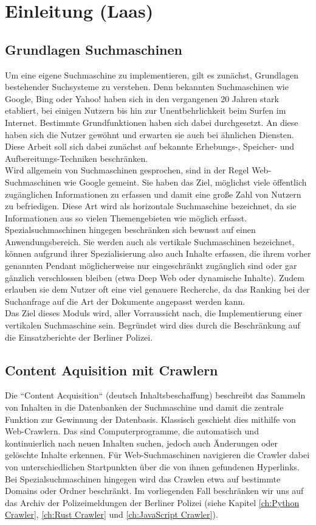 \chapter{Einleitung \small(Laas)}

\section{Grundlagen Suchmaschinen}
Um eine eigene Suchmaschine zu implementieren, gilt es zunächst, Grundlagen bestehender Suchsysteme zu verstehen. Denn bekannten Suchmaschinen wie Google, Bing oder Yahoo! haben sich in den vergangenen 20 Jahren stark etabliert, bei einigen Nutzern bis hin zur Unentbehrlichkeit beim Surfen im Internet. Bestimmte Grundfunktionen haben sich dabei durchgesetzt. An diese haben sich die Nutzer gewöhnt und erwarten sie auch bei ähnlichen Diensten. Diese Arbeit soll sich dabei zunächst auf bekannte Erhebungs-, Speicher- und Aufbereitungs-Techniken beschränken.\\
Wird allgemein von Suchmaschinen gesprochen, sind in der Regel Web-Suchmaschinen wie Google gemeint. Sie haben das Ziel, möglichst viele öffentlich zugänglichen Informationen zu erfassen und damit eine große Zahl von Nutzern zu befriedigen. Diese Art wird als horizontale Suchmaschine bezeichnet, da sie Informationen aus so vielen Themengebieten wie möglich erfasst.\\
Spezialsuchmaschinen hingegen beschränken sich bewusst auf einen Anwendungsbereich. Sie werden auch als vertikale Suchmaschinen bezeichnet, können aufgrund ihrer Spezialisierung also auch Inhalte erfassen, die ihrem vorher genannten Pendant möglicherweise nur eingeschränkt zugänglich sind oder gar gänzlich verschlossen bleiben (etwa Deep Web oder dynamische Inhalte). Zudem erlauben sie dem Nutzer oft eine viel genauere Recherche, da das Ranking bei der Suchanfrage auf die Art der Dokumente angepasst werden kann.\\
Das Ziel dieses Moduls wird, aller Vorraussicht nach, die Implementierung einer vertikalen Suchmaschine sein. Begründet wird dies durch die Beschränkung auf die Einsatzberichte der Berliner Polizei. \cite{suchmverst} \cite{boldsuche}

\section{Content Aquisition mit Crawlern}
Die ``Content Acquisition`` (deutsch Inhaltsbeschaffung) beschreibt das Sammeln von Inhalten in die Datenbanken der Suchmaschine und damit die zentrale Funktion zur Gewinnung der Datenbasis. Klassisch geschieht dies mithilfe von Web-Crawlern. Das sind Computerprogramme, die automatisch und kontinuierlich nach neuen Inhalten suchen, jedoch auch Änderungen oder gelöschte Inhalte erkennen. Für Web-Suchmaschinen navigieren die Crawler dabei von unterschiedlichen Startpunkten über die von ihnen gefundenen Hyperlinks. Bei Spezialsuchmaschinen hingegen wird das Crawlen etwa auf bestimmte Domains oder Ordner beschränkt. Im vorliegenden Fall beschränken wir uns auf das Archiv der Polizeimeldungen der Berliner Polizei (siehe Kapitel \ref{ch:Python Crawler}, \ref{ch:Rust Crawler} und \ref{ch:JavaScript Crawler}). \cite{suchmverst}


